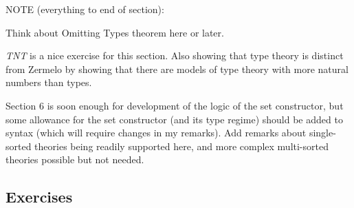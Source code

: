 \documentclass[12pt]{book}
\begin{document}
NOTE (everything to end of section):

Think about Omitting Types theorem here or later.

{\em TNT\/} is a nice exercise for this section.  Also showing that
type theory is distinct from Zermelo by showing that there are models
of type theory with more natural numbers than types.

Section 6
is soon enough for development of the logic of the set constructor,
but some allowance for the set constructor (and its type regime)
should be added to syntax (which will require changes in my remarks).
Add remarks about single-sorted theories being readily supported here,
and more complex multi-sorted theories possible but not needed.

\newpage

\subsection{Exercises}
\end{document}

